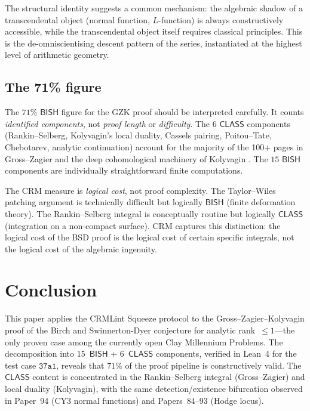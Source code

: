 \documentclass[11pt]{article}
\theoremstyle{plain}
\theoremstyle{definition}
\theoremstyle{remark}
\newcommand{\BISH}{\ensuremath{\mathsf{BISH}}}
\newcommand{\CLASS}{\ensuremath{\mathsf{CLASS}}}
\begin{document}
The structural identity suggests a common mechanism: the algebraic shadow of a transcendental object (normal function, $L$-function) is always constructively accessible, while the transcendental object itself requires classical principles. This is the de-omniscientising descent pattern of the series, instantiated at the highest level of arithmetic geometry.

\subsection{The 71\% figure}

The $71\%$ $\BISH$ figure for the GZK proof should be interpreted carefully. It counts \emph{identified components}, not \emph{proof length} or \emph{difficulty}. The $6$ $\CLASS$ components (Rankin--Selberg, Kolyvagin's local duality, Cassels pairing, Poitou--Tate, Chebotarev, analytic continuation) account for the majority of the 100+ pages in Gross--Zagier \cite{gross-zagier} and the deep cohomological machinery of Kolyvagin \cite{kolyvagin1988}. The $15$ $\BISH$ components are individually straightforward finite computations.

The CRM measure is \emph{logical cost}, not proof complexity. The Taylor--Wiles patching argument is technically difficult but logically $\BISH$ (finite deformation theory). The Rankin--Selberg integral is conceptually routine but logically $\CLASS$ (integration on a non-compact surface). CRM captures this distinction: the logical cost of the BSD proof is the logical cost of certain specific integrals, not the logical cost of the algebraic ingenuity.


\section{Conclusion}
\label{sec:conclusion}

This paper applies the CRMLint Squeeze protocol to the Gross--Zagier--Kolyvagin proof of the Birch and Swinnerton-Dyer conjecture for analytic rank~$\leq 1$---the only proven case among the currently open Clay Millennium Problems. The decomposition into $15$~$\BISH$ + $6$~$\CLASS$ components, verified in Lean~4 for the test case $\texttt{37a1}$, reveals that $71\%$ of the proof pipeline is constructively valid. The $\CLASS$ content is concentrated in the Rankin--Selberg integral (Gross--Zagier) and local duality (Kolyvagin), with the same detection/existence bifurcation observed in Paper~94 (CY3 normal functions) and Papers~84--93 (Hodge locus).
\end{document}
